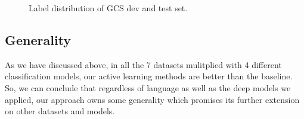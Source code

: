 \begin{figure}[th!]%
	\noindent
	\begin{center}
		
	\end{center}
	\caption{Label distribution of GCS dev and test set.}
	\label{fig:dis}
\end{figure}

\subsection{Generality}
As we have discussed above, in all the 7 datasets mulitplied with 4  different classification models, our active learning methods are better than the baseline. So, we can conclude that regardless of language as well as the deep models we applied, our approach owns some generality which promises its further extension on other datasets and models.


